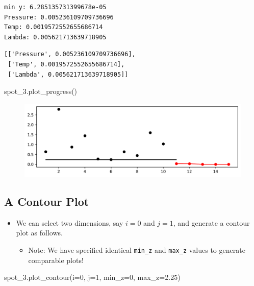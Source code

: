\documentclass[
  letterpaper,
  DIV=11,
  numbers=noendperiod]{scrreprt}
\newenvironment{Shaded}{\begin{snugshade}}{\end{snugshade}}
\newcommand{\DecValTok}[1]{\textcolor[rgb]{0.68,0.00,0.00}{#1}}
\newcommand{\FloatTok}[1]{\textcolor[rgb]{0.68,0.00,0.00}{#1}}
\newcommand{\NormalTok}[1]{\textcolor[rgb]{0.00,0.23,0.31}{#1}}
\newcommand{\OperatorTok}[1]{\textcolor[rgb]{0.37,0.37,0.37}{#1}}
\providecommand{\tightlist}{%
  \setlength{\itemsep}{0pt}\setlength{\parskip}{0pt}}\usepackage{longtable,booktabs,array}
\begin{document}
\begin{verbatim}
min y: 6.285135731399678e-05
Pressure: 0.005236109709736696
Temp: 0.0019572552655686714
Lambda: 0.005621713639718905
\end{verbatim}

\begin{verbatim}
[['Pressure', 0.005236109709736696],
 ['Temp', 0.0019572552655686714],
 ['Lambda', 0.005621713639718905]]
\end{verbatim}

\begin{Shaded}
\begin{Highlighting}[]
\NormalTok{spot\_3.plot\_progress()}
\end{Highlighting}
\end{Shaded}

\begin{figure}[H]

{\centering \includegraphics{02_spot_multidim_files/figure-pdf/cell-7-output-1.pdf}

}

\end{figure}

\hypertarget{a-contour-plot}{%
\subsection{A Contour Plot}\label{a-contour-plot}}

\begin{itemize}
\tightlist
\item
  We can select two dimensions, say \(i=0\) and \(j=1\), and generate a
  contour plot as follows.

  \begin{itemize}
  \tightlist
  \item
    Note: We have specified identical \texttt{min\_z} and
    \texttt{max\_z} values to generate comparable plots!
  \end{itemize}
\end{itemize}

\begin{Shaded}
\begin{Highlighting}[]
\NormalTok{spot\_3.plot\_contour(i}\OperatorTok{=}\DecValTok{0}\NormalTok{, j}\OperatorTok{=}\DecValTok{1}\NormalTok{, min\_z}\OperatorTok{=}\DecValTok{0}\NormalTok{, max\_z}\OperatorTok{=}\FloatTok{2.25}\NormalTok{)}
\end{Highlighting}
\end{Shaded}
\end{document}

